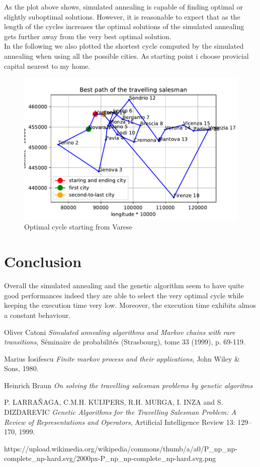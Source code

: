 \documentclass{article}
\begin{document}
\noindent As the plot above shows, simulated annealing is capable of finding optimal or slightly suboptimal solutions. However, it is reasonable to expect that as the length of the cycles increases the optimal solutions of the simulated annealing gets further away from the very best optimal solution.\\
In the following we also plotted the shortest cycle computed by the simulated annealing when using all the possible cities. As starting point i choose provicial capital nearest to my home.
\begin{figure}[H]
\includegraphics[scale=1]{../path.pdf} 
\centering
\caption{Optimal cycle starting from Varese}
\end{figure}

\section{Conclusion}
Overall the simulated annealing and the genetic algorithm seem to have quite good performances indeed they are able to select the very optimal cycle while keeping the execution time very low. Moreover, the execution time exhibits almos a constant behaviour.

\begin{thebibliography}{9}

Oliver Catoni
\textit{Simulated annealing algorithms and Markov chains with rare transitions}, Séminaire de probabilités (Strasbourg), tome 33 (1999), p. 69-119.

Marius Iosifescu
\textit{Finite markov process and their applications}, John Wiley \& Sons, 1980.

Heinrich Braun
\textit{On solving the travelling salesman problems by genetic algoritms}

P. LARRAÑAGA, C.M.H. KUIJPERS, R.H. MURGA, I. INZA and S. DIZDAREVIC
\textit{Genetic Algorithms for the Travelling Salesman Problem: A Review of Representations and Operators}, Artificial Intelligence Review 13: 129–170, 1999.

https://upload.wikimedia.org/wikipedia/commons/thumb/a/a0/P\_np\_np-complete\_np-hard.svg/2000px-P\_np\_np-complete\_np-hard.svg.png

 
\end{thebibliography}
\end{document}
